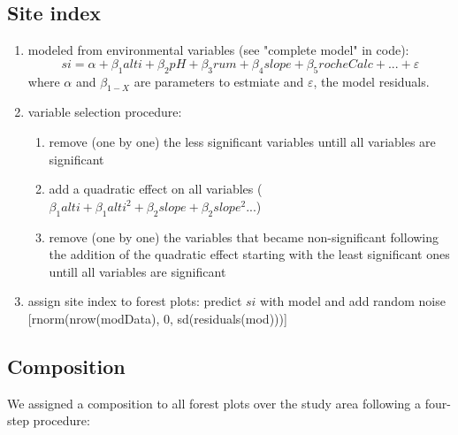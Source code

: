 \documentclass[a4paper]{article}
\begin{document}

\subsection*{Site index}
\begin{enumerate}
    \item modeled from environmental variables (see "complete model" in code):
    \begin{equation}\label{si}
      si = \alpha + \beta_1 alti + \beta_2 pH +\beta_3 rum +\beta_4 slope +\beta_5 rocheCalc+...+\varepsilon
    \end{equation}
    where $\alpha$ and $\beta_{1-X}$ are parameters to estmiate and $\varepsilon$, the model residuals.
    \item variable selection procedure:
    \begin{enumerate}
        \item remove (one by one) the less significant variables untill all variables are significant
        \item add a quadratic effect on all variables ($\beta_1alti + \beta_1alti^2 + \beta_2slope + \beta_2slope^2...$)
        \item remove (one by one) the variables that became non-significant following the addition of the quadratic effect starting with the least significant ones  untill all variables are significant
\end{enumerate}
    \item assign site index to forest plots: predict $si$ with model and add random noise   [rnorm(nrow(modData), 0, sd(residuals(mod)))]
\end{enumerate}


\subsection*{Composition}

We assigned a composition to all forest plots over the study area following a four-step procedure:
\end{document}
